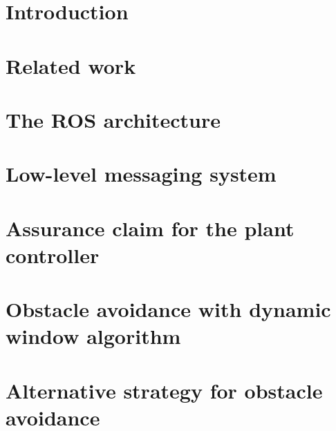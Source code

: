 \documentclass[12pt,a4paper]{article}
\begin{document}
\newpage
 
\renewcommand{\contentsname}{Table of Contents \vspace{1cm}}
\tableofcontents

\restoregeometry %
\newpage

\section{Introduction}


\section{Related work}


\section{The ROS architecture}


\section{Low-level messaging system}\label{prop}


\section{Assurance claim for the plant controller}


\section{Obstacle avoidance with dynamic window algorithm}


\section{Alternative strategy for obstacle avoidance}





\end{document}
